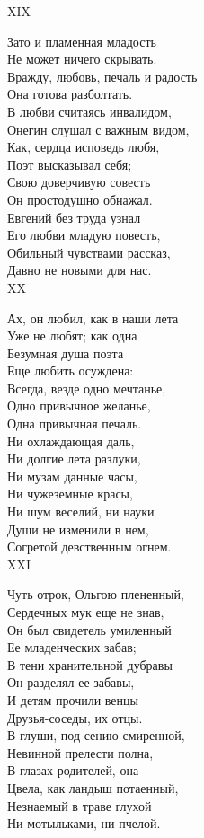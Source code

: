 XIX

Зато и пламенная младость\\
Не может ничего скрывать.\\
Вражду, любовь, печаль и радость\\
Она готова разболтать.\\
В любви считаясь инвалидом,\\
Онегин слушал с важным видом,\\
Как, сердца исповедь любя,\\
Поэт высказывал себя;\\
Свою доверчивую совесть\\
Он простодушно обнажал.\\
Евгений без труда узнал\\
Его любви младую повесть,\\
Обильный чувствами рассказ,\\
Давно не новыми для нас.\\

XX

Ах, он любил, как в наши лета\\
Уже не любят; как одна\\
Безумная душа поэта\\
Еще любить осуждена:\\
Всегда, везде одно мечтанье,\\
Одно привычное желанье,\\
Одна привычная печаль.\\
Ни охлаждающая даль,\\
Ни долгие лета разлуки,\\
Ни музам данные часы,\\
Ни чужеземные красы,\\
Ни шум веселий, ни науки\\
Души не изменили в нем,\\
Согретой девственным огнем.\\

XXI

Чуть отрок, Ольгою плененный,\\
Сердечных мук еще не знав,\\
Он был свидетель умиленный\\
Ее младенческих забав;\\
В тени хранительной дубравы\\
Он разделял ее забавы,\\
И детям прочили венцы\\
Друзья-соседы, их отцы.\\
В глуши, под сению смиренной,\\
Невинной прелести полна,\\
В глазах родителей, она\\
Цвела, как ландыш потаенный,\\
Незнаемый в траве глухой\\
Ни мотыльками, ни пчелой.\\

